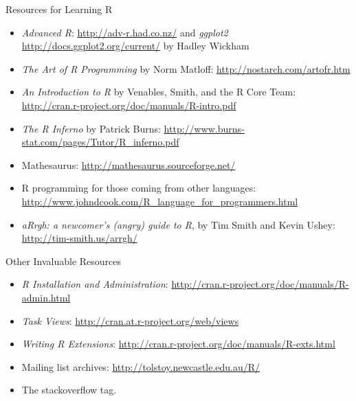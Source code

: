 \begin{frame}
  \begin{block}{Resources for Learning R}\pause
  \begin{itemize}[<+-|alert@+>]
    \item \emph{Advanced R}: \url{http://adv-r.had.co.nz/} and
      \emph{ggplot2} \url{http://docs.ggplot2.org/current/} by Hadley Wickham
    \item \emph{The Art of R Programming} by Norm Matloff:
\url{http://nostarch.com/artofr.htm}\\[.2cm]

    \item \emph{An Introduction to R} by Venables, Smith, and the R Core Team:
\url{http://cran.r-project.org/doc/manuals/R-intro.pdf}\\[.2cm]

    \item \emph{The R Inferno} by Patrick Burns:
\url{http://www.burns-stat.com/pages/Tutor/R_inferno.pdf}\\[.2cm]

    \item Mathesaurus:  \url{http://mathesaurus.sourceforge.net/}\\[.2cm]

    \item R programming for those coming from other languages:
\url{http://www.johndcook.com/R_language_for_programmers.html}\\[.2cm]

    \item \emph{aRrgh: a newcomer's (angry) guide to R}, by Tim Smith and Kevin
Ushey:
    \url{http://tim-smith.us/arrgh/}
  \end{itemize}
\end{block}
\end{frame}


\begin{frame}
  \begin{block}{Other Invaluable Resources}\pause
    \begin{itemize}[<+-|alert@+>]
    \item \emph{R Installation and Administration}:
      \url{http://cran.r-project.org/doc/manuals/R-admin.html}
    \item \emph{Task Views}:
      \url{http://cran.at.r-project.org/web/views}
    \item \emph{Writing R Extensions}:
      \url{http://cran.r-project.org/doc/manuals/R-exts.html}
    \item Mailing list archives: \url{http://tolstoy.newcastle.edu.au/R/}
    \item The \code{[R]} stackoverflow tag.
    \end{itemize}
  \end{block}
\end{frame}



